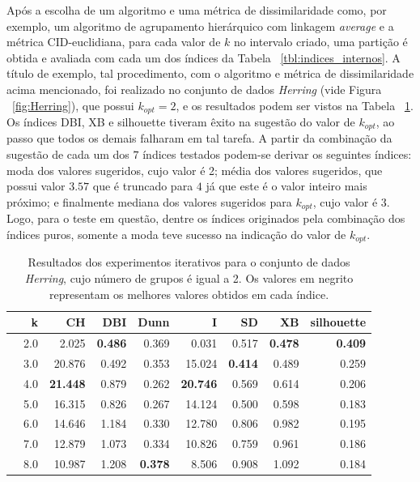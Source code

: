 Após a escolha de um algoritmo e uma métrica de dissimilaridade como, por exemplo, um algoritmo de agrupamento hierárquico com linkagem \emph{average} e a métrica CID-euclidiana, para cada valor de $k$ no intervalo criado, uma partição é obtida e avaliada com cada um dos índices da Tabela ~\ref{tbl:indices_internos}. A título de exemplo, tal procedimento, com o algoritmo e métrica de dissimilaridade acima mencionado, foi realizado no conjunto de dados \emph{Herring} (vide Figura ~\ref{fig:Herring}), que possui $k_{opt}=2$, e os resultados podem ser vistos na Tabela ~\ref{tbl:indices_iterativos}. Os índices DBI, XB e silhouette tiveram êxito na sugestão do valor de $k_{opt}$, ao passo que todos os demais falharam em tal tarefa. A partir da combinação da sugestão de cada um dos $7$ índices testados podem-se derivar os seguintes índices: moda dos valores sugeridos, cujo valor é 2; média dos valores sugeridos, que possui valor $3.57$ que é truncado para $4$ já que este é o valor inteiro mais próximo; e finalmente mediana dos valores sugeridos para $k_{opt}$, cujo valor é 3. Logo, para o teste em questão, dentre os índices originados pela combinação dos índices puros, somente a moda teve sucesso na indicação do valor de $k_{opt}$.

\begin{table} []
	\centering
	\caption{Resultados dos experimentos iterativos para o conjunto de dados \emph{Herring}, cujo número de grupos é igual a 2. Os valores em negrito representam os melhores valores obtidos em cada índice.}  \label{tbl:indices_iterativos}
		\begin{tabular}{lrrrrrrrr}
			\toprule
			{} &    k &      CH &    DBI &   Dunn &       I &     SD &     XB &  silhouette \\
			\midrule
   \rowcolor{lightgray} &  2.0 &   2.025 &  \bfseries{0.486} &  0.369 &   0.031 &  0.517 &  \bfseries{0.478} &       \bfseries{0.409} \\
   &  3.0 &  20.876 &  0.492 &  0.353 &  15.024 &  \bfseries{0.414} &  0.489 &       0.259 \\
   &  4.0 &  \bfseries{21.448} &  0.879 &  0.262 &  \bfseries{20.746} &  0.569 &  0.614 &       0.206 \\
   &  5.0 &  16.315 &  0.826 &  0.267 &  14.124 &  0.500 &  0.598 &       0.183 \\
   &  6.0 &  14.646 &  1.184 &  0.330 &  12.780 &  0.806 &  0.982 &       0.195 \\
   &  7.0 &  12.879 &  1.073 &  0.334 &  10.826 &  0.759 &  0.961 &       0.186 \\
   &  8.0 &  10.987 &  1.208 &  \bfseries{0.378} &   8.506 &  0.908 &  1.092 &       0.184 \\
			\bottomrule
		\end{tabular}
\end{table} 

